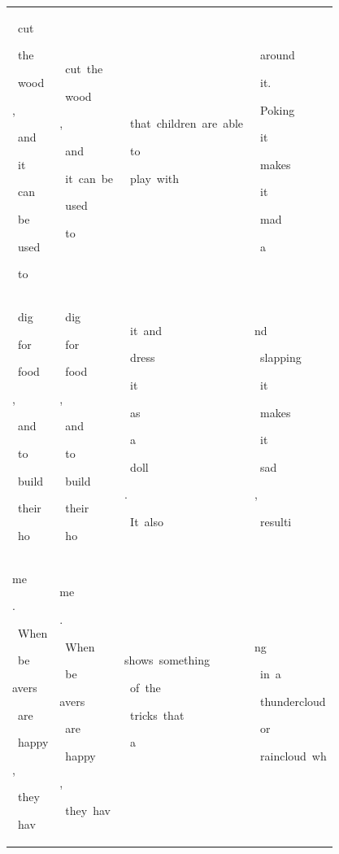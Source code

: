 \begin{table}[h]
\begin{tabular}{ l | l | l | l }
  \hline \colorbox{cm_31!40}{\strut \ cut}\colorbox{cm_38!40}{\strut \ the}\colorbox{cm_29!40}{\strut \ wood}\colorbox{cm_37!40}{\strut ,}\colorbox{cm_36!40}{\strut \ and}\colorbox{cm_23!40}{\strut \ it}\colorbox{cm_35!40}{\strut \ can}\colorbox{cm_39!40}{\strut \ be}\colorbox{cm_28!40}{\strut \ used}\colorbox{cm_33!40}{\strut \ to} & \colorbox{cm_12!40}{\strut \ cut\ the}\colorbox{cm_25!40}{\strut \ wood}\colorbox{cm_12!40}{\strut ,}\colorbox{cm_25!40}{\strut \ and}\colorbox{cm_12!40}{\strut \ it\ can\ be}\colorbox{cm_0!40}{\strut \ used}\colorbox{cm_12!40}{\strut \ to} & \colorbox{cm_0!40}{\strut \ that\ children\ are\ able}\colorbox{cm_12!40}{\strut \ to}\colorbox{cm_0!40}{\strut \ play\ with} & \colorbox{cm_0!40}{\strut \ around}\colorbox{cm_12!40}{\strut \ it.}\colorbox{cm_0!40}{\strut \ Poking}\colorbox{cm_12!40}{\strut \ it}\colorbox{cm_0!40}{\strut \ makes}\colorbox{cm_12!40}{\strut \ it}\colorbox{cm_0!40}{\strut \ mad}\colorbox{cm_12!40}{\strut \ a} \\ 
 \colorbox{cm_32!40}{\strut \ dig}\colorbox{cm_28!40}{\strut \ for}\colorbox{cm_44!40}{\strut \ food}\colorbox{cm_35!40}{\strut ,}\colorbox{cm_30!40}{\strut \ and}\colorbox{cm_32!40}{\strut \ to}\colorbox{cm_28!40}{\strut \ build}\colorbox{cm_17!40}{\strut \ their}\colorbox{cm_34!40}{\strut \ ho} & \colorbox{cm_0!40}{\strut \ dig}\colorbox{cm_12!40}{\strut \ for}\colorbox{cm_25!40}{\strut \ food}\colorbox{cm_12!40}{\strut ,}\colorbox{cm_25!40}{\strut \ and}\colorbox{cm_38!40}{\strut \ to}\colorbox{cm_0!40}{\strut \ build}\colorbox{cm_12!40}{\strut \ their}\colorbox{cm_0!40}{\strut \ ho} & \colorbox{cm_12!40}{\strut \ it\ and}\colorbox{cm_0!40}{\strut \ dress}\colorbox{cm_12!40}{\strut \ it}\colorbox{cm_0!40}{\strut \ as}\colorbox{cm_12!40}{\strut \ a}\colorbox{cm_0!40}{\strut \ doll}\colorbox{cm_12!40}{\strut .}\colorbox{cm_0!40}{\strut \ It\ also\ } & \colorbox{cm_12!40}{\strut nd}\colorbox{cm_0!40}{\strut \ slapping}\colorbox{cm_12!40}{\strut \ it}\colorbox{cm_0!40}{\strut \ makes}\colorbox{cm_12!40}{\strut \ it}\colorbox{cm_0!40}{\strut \ sad}\colorbox{cm_12!40}{\strut ,}\colorbox{cm_0!40}{\strut \ resulti} \\ 
 \colorbox{cm_34!40}{\strut me}\colorbox{cm_29!40}{\strut .}\colorbox{cm_32!40}{\strut \ When}\colorbox{cm_26!40}{\strut \ be}\colorbox{cm_36!40}{\strut avers}\colorbox{cm_32!40}{\strut \ are}\colorbox{cm_30!40}{\strut \ happy}\colorbox{cm_32!40}{\strut ,}\colorbox{cm_34!40}{\strut \ they}\colorbox{cm_32!40}{\strut \ hav} & \colorbox{cm_0!40}{\strut me}\colorbox{cm_12!40}{\strut .}\colorbox{cm_0!40}{\strut \ When}\colorbox{cm_12!40}{\strut \ be}\colorbox{cm_0!40}{\strut avers}\colorbox{cm_12!40}{\strut \ are}\colorbox{cm_0!40}{\strut \ happy}\colorbox{cm_12!40}{\strut ,}\colorbox{cm_25!40}{\strut \ they\ hav} & \colorbox{cm_0!40}{\strut shows\ something}\colorbox{cm_12!40}{\strut \ of\ the}\colorbox{cm_0!40}{\strut \ tricks\ that}\colorbox{cm_12!40}{\strut \ a} & \colorbox{cm_0!40}{\strut ng}\colorbox{cm_12!40}{\strut \ in\ a}\colorbox{cm_0!40}{\strut \ thundercloud}\colorbox{cm_12!40}{\strut \ or}\colorbox{cm_0!40}{\strut \ raincloud\ wh} \\ 

\end{tabular}
\end{table}
